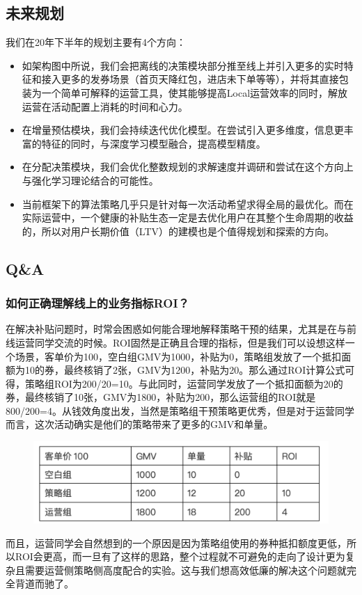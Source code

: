 \documentclass[12pt]{article}
\begin{document}
\subsection{未来规划}
我们在20年下半年的规划主要有4个方向：
\begin{itemize}
\setlength{\itemsep}{0pt}
\setlength{\parsep}{0pt}
\setlength{\parskip}{0pt}
    \item 如架构图中所说，我们会把离线的决策模块部分推至线上并引入更多的实时特征和接入更多的发券场景（首页天降红包，进店未下单等等），并将其直接包装为一个简单可解释的运营工具，使其能够提高Local运营效率的同时，解放运营在活动配置上消耗的时间和心力。

    \item 在增量预估模块，我们会持续迭代优化模型。在尝试引入更多维度，信息更丰富的特征的同时，与深度学习模型融合，提高模型精度。

    \item 在分配决策模块，我们会优化整数规划的求解速度并调研和尝试在这个方向上与强化学习理论结合的可能性。

    \item 当前框架下的算法策略几乎只是针对每一次活动希望求得全局的最优化。而在实际运营中，一个健康的补贴生态一定是去优化用户在其整个生命周期的收益的，所以对用户长期价值（LTV）的建模也是个值得规划和探索的方向。
\end{itemize}

\subsection{Q\&A}
\subsubsection{如何正确理解线上的业务指标ROI？}
在解决补贴问题时，时常会困惑如何能合理地解释策略干预的结果，尤其是在与前线运营同学交流的时候。ROI固然是正确且合理的指标，但是我们可以设想这样一个场景，客单价为100，空白组GMV为1000，补贴为0，策略组发放了一个抵扣面额为10的券，最终核销了2张，GMV为1200，补贴为20。那么通过ROI计算公式可得，策略组ROI为200/20=10。与此同时，运营同学发放了一个抵扣面额为20的券，最终核销了10张，GMV为1800，补贴为200，那么运营组的ROI就是800/200=4。从钱效角度出发，当然是策略组干预策略更优秀，但是对于运营同学而言，这次活动确实是他们的策略带来了更多的GMV和单量。
\begin{figure}[H]
    \centering
    \includegraphics[width=.8\textwidth]{fig/Casual_Inference_In_Didi_22.png}
\end{figure}
而且，运营同学会自然想到的一个原因是因为策略组使用的券种抵扣额度更低，所以ROI会更高，而一旦有了这样的思路，整个过程就不可避免的走向了设计更为复杂且需要运营侧策略侧高度配合的实验。这与我们想高效低廉的解决这个问题就完全背道而驰了。
\end{document}
